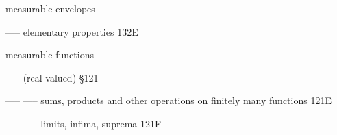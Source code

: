 


















\indexmedskip





















































measurable envelopes

----- elementary properties 132E



measurable functions

----- (real-valued) \S121

----- ----- sums, products and other operations on finitely many functions 121E

----- ----- limits, infima, suprema 121F



























